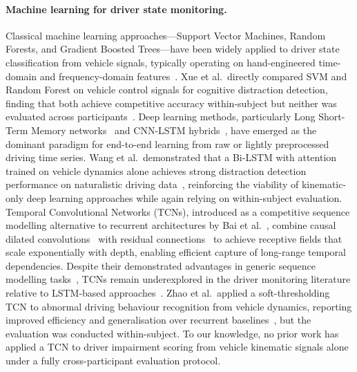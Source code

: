 \paragraph{Machine learning for driver state monitoring.}
Classical machine learning approaches---Support Vector Machines, Random Forests,
and Gradient Boosted Trees---have been widely applied to driver state classification
from vehicle signals, typically operating on hand-engineered time-domain and
frequency-domain features~\cite{Kaplan2015, Kumar2023, Xue2023}.
Xue et al.\ directly compared SVM and Random Forest on vehicle control signals
for cognitive distraction detection, finding that both achieve competitive
accuracy within-subject but neither was evaluated across
participants~\cite{Xue2023}.
Deep learning methods, particularly Long Short-Term Memory
networks~\cite{Hochreiter1997} and CNN-LSTM hybrids~\cite{Kwon2021}, have
emerged as the dominant paradigm for end-to-end learning from raw or lightly
preprocessed driving time series.
Wang et al.\ demonstrated that a Bi-LSTM with attention trained on vehicle
dynamics alone achieves strong distraction detection performance on naturalistic
driving data~\cite{Wang2022}, reinforcing the viability of kinematic-only deep
learning approaches while again relying on within-subject evaluation.
Temporal Convolutional Networks (TCNs), introduced as a competitive
sequence modelling alternative to recurrent architectures by Bai et al.~\cite{Bai2018},
combine causal dilated convolutions~\cite{vandenOord2016} with residual
connections~\cite{He2016} to achieve receptive fields that scale exponentially
with depth, enabling efficient capture of long-range temporal dependencies.
Despite their demonstrated advantages in generic sequence modelling
tasks~\cite{Bai2018}, TCNs remain underexplored in the driver monitoring
literature relative to LSTM-based approaches~\cite{Kaplan2015, Wang2022}.
Zhao et al.\ applied a soft-thresholding TCN to abnormal driving behaviour
recognition from vehicle dynamics, reporting improved efficiency and
generalisation over recurrent baselines~\cite{Zhao2022},
but the evaluation was conducted within-subject.
To our knowledge, no prior work has applied a TCN to driver impairment scoring
from vehicle kinematic signals alone under a fully cross-participant evaluation protocol.

